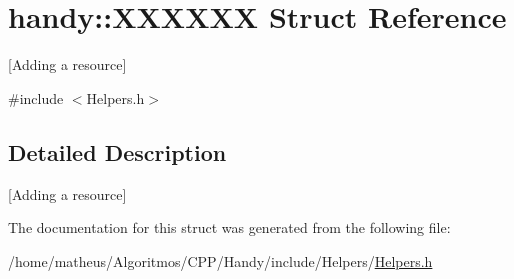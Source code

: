 \hypertarget{structhandy_1_1XXXXXX}{}\section{handy\+:\+:X\+X\+X\+X\+XX Struct Reference}
\label{structhandy_1_1XXXXXX}


\mbox{[}Adding a resource\mbox{]}  




{\ttfamily \#include $<$Helpers.\+h$>$}



\subsection{Detailed Description}
\mbox{[}Adding a resource\mbox{]} 

The documentation for this struct was generated from the following file\+:\begin{DoxyCompactItemize}
\item 
/home/matheus/\+Algoritmos/\+C\+P\+P/\+Handy/include/\+Helpers/\hyperlink{Helpers_2Helpers_8h}{Helpers.\+h}\end{DoxyCompactItemize}
